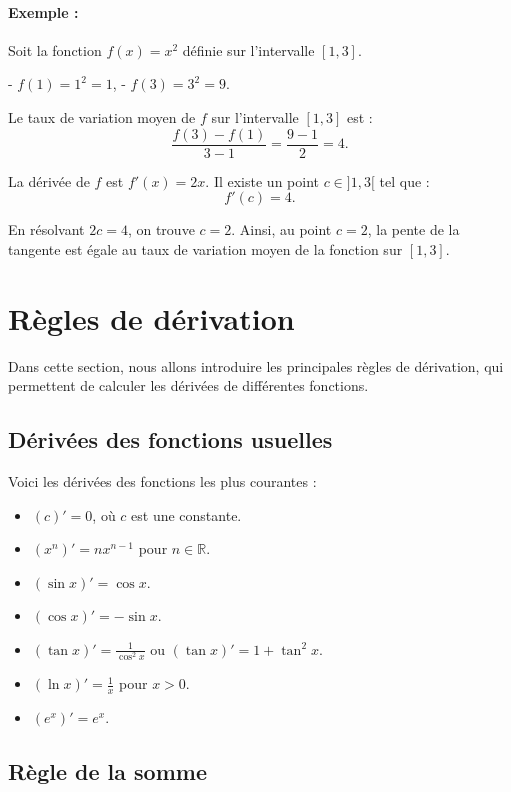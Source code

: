 \documentclass{article}
\begin{document}
	\paragraph{Exemple :} Soit la fonction \( f(x) = x^2 \) définie sur l'intervalle \( [1, 3] \).
	
	- \( f(1) = 1^2 = 1 \),
	- \( f(3) = 3^2 = 9 \).
	
	Le taux de variation moyen de \( f \) sur l'intervalle \( [1, 3] \) est :
	\[
	\frac{f(3) - f(1)}{3 - 1} = \frac{9 - 1}{2} = 4.
	\]
	
	La dérivée de \( f \) est \( f'(x) = 2x \). Il existe un point \( c \in ]1, 3[ \) tel que :
	\[
	f'(c) = 4.
	\]
	
	En résolvant \( 2c = 4 \), on trouve \( c = 2 \). Ainsi, au point \( c = 2 \), la pente de la tangente est égale au taux de variation moyen de la fonction sur \( [1, 3] \).
	\section{Règles de dérivation}
	
	Dans cette section, nous allons introduire les principales règles de dérivation, qui permettent de calculer les dérivées de différentes fonctions.
	
	\subsection{Dérivées des fonctions usuelles}
	
	Voici les dérivées des fonctions les plus courantes :
	\begin{itemize}
		\item \( (c)' = 0 \), où \( c \) est une constante.
		\item \( (x^n)' = nx^{n-1} \) pour \( n \in \mathbb{R} \).
		\item \( (\sin x)' = \cos x \).
		\item \( (\cos x)' = -\sin x \).
		\item \( (\tan x)' = \frac{1}{\cos^2 x} \) ou \( (\tan x)' = 1 + \tan^2 x \).
		\item \( (\ln x)' = \frac{1}{x} \) pour \( x > 0 \).
		\item \( (e^x)' = e^x \).
	\end{itemize}
	
	\subsection{Règle de la somme}
	
\end{document}
